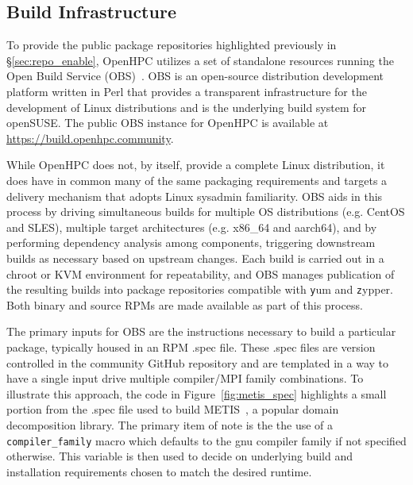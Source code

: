 \documentclass{sig-alternate-05-2015}
\begin{document}

\subsection{Build Infrastructure} \label{sec:build_infra}

To provide the public package repositories highlighted previously in
\S\ref{sec:repo_enable}, OpenHPC utilizes a set of standalone resources
running the Open Build Service (OBS)~\cite{OBS_url}.  OBS is an open-source
distribution development platform written in Perl that provides a transparent
infrastructure for the development of Linux distributions and is the underlying
build system for openSUSE.  The public OBS instance for OpenHPC is available at
\url{https://build.openhpc.community}.

While OpenHPC does not, by itself, provide a complete Linux distribution, it
does have in common many of the same packaging requirements and targets a
delivery mechanism that adopts Linux sysadmin familiarity.  OBS aids in this
process by driving simultaneous builds for multiple OS distributions (e.g. 
CentOS and SLES), multiple target architectures (e.g. x86\_64 and aarch64),
and by performing dependency analysis among components, triggering downstream
builds as necessary based on upstream changes. Each build is carried out in a
chroot or KVM environment for repeatability, and OBS manages publication of the resulting
builds into package repositories compatible with {\texttt yum} and {\texttt
  zypper}. Both binary and source RPMs are made available as part of this process.

The primary inputs for OBS are the instructions necessary to build a particular
package, typically housed in an RPM .spec file. These .spec files are version controlled in the
community GitHub repository and are templated in a way to have a single input
drive multiple compiler/MPI family combinations.  To illustrate this approach,
the code in Figure~\ref{fig:metis_spec} highlights a small portion from the .spec file used to build
METIS~\cite{Karypis:1998}, a popular domain decomposition library. The primary
item of note is the the use of a \texttt{compiler\_family} macro which defaults
to the gnu compiler family if not specified otherwise.  This variable is then used
to decide on underlying build and installation requirements chosen to match the
desired runtime.
\end{document}
